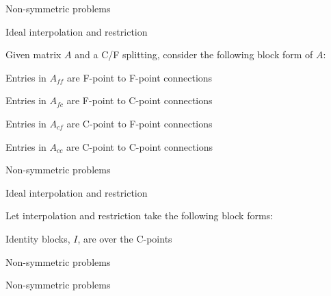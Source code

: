 \documentclass[18pt,xcolor=table]{beamer}
\begin{document}
\begin{frame}{Non-symmetric problems}
\begin{block}{Ideal interpolation and restriction}
\bit
\item Given matrix $A$ and a C/F splitting, consider the following block form of $A$:
\item Entries in $A_{ff}$ are F-point to F-point connections 
\item Entries in $A_{fc}$ are F-point to C-point connections 
\item Entries in $A_{cf}$ are C-point to F-point connections 
\item Entries in $A_{cc}$ are C-point to C-point connections 
\eit
\end{block}
\end{frame}

\begin{frame}{Non-symmetric problems}
\begin{block}{Ideal interpolation and restriction}
\bit
\item Let interpolation and restriction take the following block forms:
\item Identity blocks, $I$, are over the C-points
\eit
\end{block}
\end{frame}






\begin{frame}{Non-symmetric problems}
\begin{block}{}
\bit
\item 
\eit
\end{block}
\end{frame}

\begin{frame}{Non-symmetric problems}
\begin{block}{}
\bit
\item 
\eit
\end{block}
\end{frame}
\end{document}
